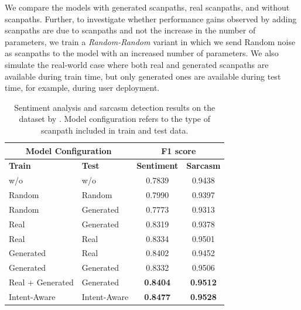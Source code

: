 We compare the models with generated scanpaths, real scanpaths, and without scanpaths. Further, to investigate whether performance gains observed by adding scanpaths are due to scanpaths and not the increase in the number of parameters, we train a \textit{Random-Random} variant in which we send Random noise as scanpaths to the model with an increased number of parameters. We also simulate the real-world case where both real and generated scanpaths are available during train time, but only generated ones are available during test time, for example, during user deployment. 
\begin{table}[!t]
\centering
\begin{tabular}{llcc} 
\toprule
\multicolumn{2}{c}{\textbf{Model Configuration}} & \multicolumn{2}{c}{\textbf{F1 score}}  \\ 
\midrule
\textbf{Train}   & \textbf{Test}                 & \textbf{Sentiment} & \textbf{Sarcasm}           \\ 
\midrule
w/o              & w/o                           & 0.7839             & 0.9438                     \\
Random           & Random                     & 0.7990             & 0.9397    \\
Random           & Generated                     & 0.7773             & 0.9313                     \\
Real             & Generated                     & 0.8319             & 0.9378                     \\
Real      & Real        & 0.8334        & 0.9501             \\
Generated        & Real                          & 0.8402             & 0.9452                     \\
Generated        & Generated                     & 0.8332             & 0.9506                     \\
Real + Generated & Generated                     & \textbf{0.8404}    & \textbf{0.9512}            \\ \midrule

Intent-Aware & Intent-Aware & \textbf{0.8477} & \textbf{0.9528} \\ \bottomrule
\end{tabular}
\caption{Sentiment analysis and sarcasm detection results on the dataset by \cite{mishra2016predicting}. Model configuration refers to the type of scanpath included in train and test data.\label{tab:iitb_classifier_results}
}
\end{table}

